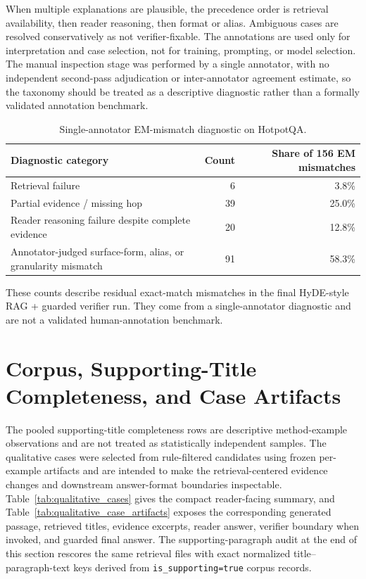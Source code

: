 \documentclass[10pt]{article}
\begin{document}
When multiple explanations are plausible, the precedence order is retrieval availability, then reader reasoning, then format or alias. Ambiguous cases are resolved conservatively as not verifier-fixable. The annotations are used only for interpretation and case selection, not for training, prompting, or model selection. The manual inspection stage was performed by a single annotator, with no independent second-pass adjudication or inter-annotator agreement estimate, so the taxonomy should be treated as a descriptive diagnostic rather than a formally validated annotation benchmark.

\begin{table}[t]
\centering
\caption{Single-annotator EM-mismatch diagnostic on HotpotQA.}
\label{tab:single_annotator_error_taxonomy}
\small
\begin{threeparttable}
\begin{tabularx}{\textwidth}{>{\raggedright\arraybackslash}X r r}
\toprule
Diagnostic category & Count & Share of 156 EM mismatches \\
\midrule
Retrieval failure & 6 & 3.8\% \\
Partial evidence / missing hop & 39 & 25.0\% \\
Reader reasoning failure despite complete evidence & 20 & 12.8\% \\
Annotator-judged surface-form, alias, or granularity mismatch & 91 & 58.3\% \\
\bottomrule
\end{tabularx}
\begin{tablenotes}
\footnotesize
\item These counts describe residual exact-match mismatches in the final HyDE-style RAG + guarded verifier run. They come from a single-annotator diagnostic and are not a validated human-annotation benchmark.
\end{tablenotes}
\end{threeparttable}
\end{table}

\clearpage
\section{Corpus, Supporting-Title Completeness, and Case Artifacts}
\label{sec:supp_evidence_case_artifacts}

The pooled supporting-title completeness rows are descriptive method-example observations and are not treated as statistically independent samples. The qualitative cases were selected from rule-filtered candidates using frozen per-example artifacts and are intended to make the retrieval-centered evidence changes and downstream answer-format boundaries inspectable. Table~\ref{tab:qualitative_cases} gives the compact reader-facing summary, and Table~\ref{tab:qualitative_case_artifacts} exposes the corresponding generated passage, retrieved titles, evidence excerpts, reader answer, verifier boundary when invoked, and guarded final answer. The supporting-paragraph audit at the end of this section rescores the same retrieval files with exact normalized title--paragraph-text keys derived from \texttt{is\_supporting=true} corpus records.
\end{document}
